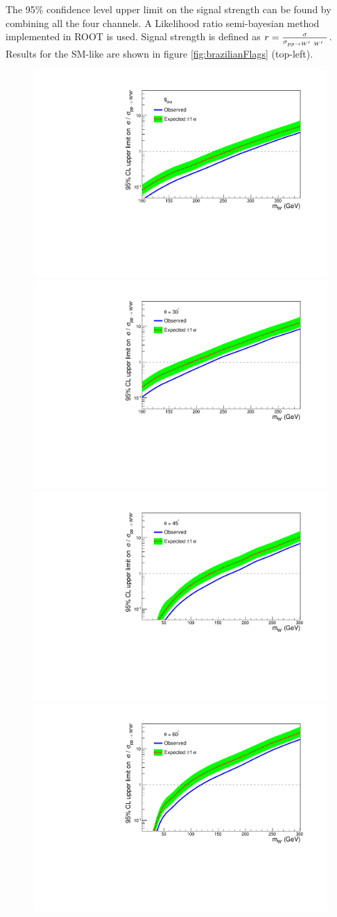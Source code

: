 The 95\% confidence level upper limit on the signal strength can be found by combining all the four channels. A Likelihood ratio semi-bayesian method implemented in ROOT \cite{Brun:1997pa} is used. Signal strength is defined as $r = \frac{ \sigma }{\sigma_{pp \to W^\prime~W^\prime~} }$. Results for the SM-like \wprime are shown in figure  \ref{fig:brazilianFlags} (top-left). 
\begin{figure}[!htb]
  \centering
  \includegraphics*[width=.45\textwidth]{figs/mix0b.pdf}
  \vspace{3mm}	
  \includegraphics*[width=.45\textwidth]{figs/mix30b.pdf}
  \hspace{3mm}
  \includegraphics*[width=.45\textwidth]{figs/mix45b.pdf}
  \vspace{3mm}	
  \includegraphics*[width=.45\textwidth]{figs/mix60b.pdf}

\end{figure}
